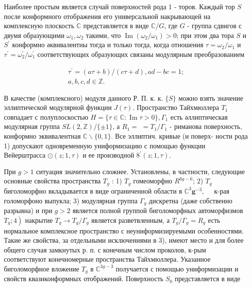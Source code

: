 \documentclass[10pt]{article}
\begin{document}
Наиболее простым является случай поверхностей рода 1 - торов. Каждый тор $S$ после конформного отображения его универсальной накрывающей на комплексную плоскость $\mathbb{C}$ представляется в виде $\mathbb{C} / G$, где $G$ - группа сдвигов с двумя образующими $\omega_{1}, \omega_{2}$ такими, что $\operatorname{Im}\left(\omega_{2} / \omega_{1}\right)>0$; при этом два тора $S$ и $S^{\prime}$ конформно әквивалентны тогда и только тогда, когда отношения $\tau=\omega_{2} / \omega_{1}$ и $\tau^{\prime}=\omega_{2}^{\prime} / \omega_{1}^{\prime}$ соответствующих образующих связаны модулярным преобразованием



\[

\begin{gathered}

\tau^{\prime}=(a \tau+b) /(c \tau+d), a d-b c=1 ; \\

a, b, c, d \in \mathbb{Z} .

\end{gathered}

\]



В качестве (комплексного) модуля данного Р. П. к. к. $\{S\}$ можно взять значение эллиптической модулярной функции $J(\tau)$. Пространство Тайхмюллера $T_{1}$ совпадает с полуплоскостью $H=\{\tau \in \mathbb{C}: \operatorname{Im} \tau>0\}, \Gamma_{1}$ есть әллиптическая модулярная группа $S L(2, \mathbb{Z}) /\{ \pm 1\}$, а $R_{1}=$ $=T_{1} / \Gamma_{1}$ - риманова поверхность, конформно эквивалентная $\mathbb{C} \backslash\{0,1\}$. Все эллиптич. кривые (и поверх- ности рода 1) допускают одновременную униформизацию с помощью функции Вейерштрасса $\odot(z ; 1, \tau)$ и ее производной $8^{\prime}(z ; 1, \tau)$.



При $g>1$ ситуация значительно сложнее. Установлены, в частности, следующие основные свойства пространства $T_{g}$ : 1) $T_{g}$ гомеоморфно $R^{6 g-6}$; 2) $T_{g}$ биголоморфно вкладывается в виде ограниченной области в $\mathbb{C}^{3} \boldsymbol{g}^{-3}, \quad$ к-рая голоморфоно выпукла; 3) модулярная группа $\Gamma_{g}$ дискретна (даже собственно разрывна) и при $g>2$ является полной группой биголоморфных автоморфизмов $\left.T_{g} ; 4\right)$ накрытие $T_{g} \rightarrow T_{g} / \Gamma_{g}$ является разветвленным, а $T_{g} / \Gamma_{g}=R_{g}$ есть нормальное комплексное пространство с неуниформизируемыми особенностями. Такие же свойства, за отдельными исключениями в 3), имеют место и для более общего случая замкнутых р. п. с конечным числом проколов, к-рым соответствуют конечномерные пространства Тайхмюллера. Указанное биголоморфное вложение $T_{g}$ в $\mathbb{C}^{3 g-3}$ получается с помощью униформизации и свойств квазиконформных отображений. Поверхность $S_{0}$ представляется в виде
\end{document}
